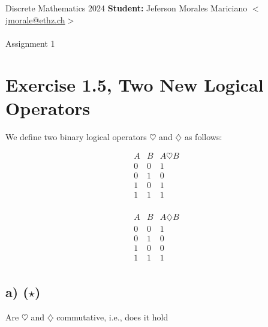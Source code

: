 \documentclass[unicode,11pt,a4paper,oneside,numbers=endperiod,openany]{scrartcl}
\begin{document}
\setassignment
{}

\serieheader
{Discrete Mathematics}
{2024}
{%
\textbf{Student:} Jeferson Morales Mariciano 
\href{mailto:jmorale@ethz.ch}{\(<\)jmorale@ethz.ch\(>\)} \\\\}
{\vspace{-1cm}}%
{Assignment 1}{}

\section{Exercise 1.5, Two New Logical Operators}

We define two binary logical operators \( \heartsuit \) and \( \diamondsuit \) as follows:

\begin{center}
\begin{minipage}{0.3\textwidth}

\[
\begin{array}{c|c||c}
A & B & A \heartsuit B \\
\hline
0 & 0 & 1 \\
0 & 1 & 0 \\
1 & 0 & 1 \\
1 & 1 & 1 \\
\end{array}
\]

\end{minipage}
\begin{minipage}{0.3\textwidth}

\[
\begin{array}{c|c||c}
A & B & A \diamondsuit B \\
\hline
0 & 0 & 1 \\
0 & 1 & 0 \\
1 & 0 & 0 \\
1 & 1 & 1 \\
\end{array}
\]

\end{minipage}
\end{center}

\subsection{a) (\(\star\))}  
Are \(\heartsuit\) and \(\diamondsuit\) commutative, i.e., does it hold
\end{document}
